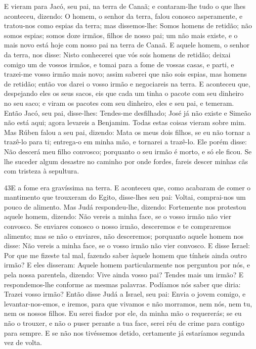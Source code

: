 E vieram para Jacó, seu pai, na terra de Canaã; e contaram-lhe
tudo o que lhes aconteceu, dizendo: O homem, o senhor da
terra, falou conosco asperamente, e tratou-nos como espias da terra;
mas dissemos-lhe: Somos homens de retidão; não somos espias;
somos doze irmãos, filhos de nosso pai; um não mais existe, e
o mais novo está hoje com nosso pai na terra de Canaã. E
aquele homem, o senhor da terra, nos disse: Nisto conhecerei que vós
sois homens de retidão; deixai comigo um de vossos irmãos, e tomai
para a fome de vossas casas, e parti, e trazei-me vosso irmão
mais novo; assim saberei que não sois espias, mas homens de retidão;
então vos darei o vosso irmão e negociareis na terra. E
aconteceu que, despejando eles os seus sacos, eis que cada um tinha
o pacote com seu dinheiro no seu saco; e viram os pacotes com seu
dinheiro, eles e seu pai, e temeram. Então Jacó, seu pai,
disse-lhes: Tendes-me desfilhado; José já não existe e Simeão não
está aqui; agora levareis a Benjamim. Todas estas coisas vieram
sobre mim. Mas Rúben falou a seu pai, dizendo: Mata os meus
dois filhos, se eu não tornar a trazê-lo para ti; entrega-o em minha
mão, e tornarei a trazê-lo. Ele porém disse: Não descerá meu
filho convosco; porquanto o seu irmão é morto, e só ele ficou. Se
lhe suceder algum desastre no caminho por onde fordes, fareis descer
minhas cãs com tristeza à sepultura.

\smallskip

\lettrine{43} E a fome era gravíssima na terra. E
aconteceu que, como acabaram de comer o mantimento que trouxeram do
Egito, disse-lhes seu pai: Voltai, comprai-nos um pouco de alimento.
Mas Judá respondeu-lhe, dizendo: Fortemente nos protestou aquele
homem, dizendo: Não vereis a minha face, se o vosso irmão não vier
convosco. Se enviares conosco o nosso irmão, desceremos e te
compraremos alimento; mas se não o enviares, não desceremos;
porquanto aquele homem nos disse: Não vereis a minha face, se o
vosso irmão não vier convosco. E disse Israel: Por que me
fizeste tal mal, fazendo saber àquele homem que tínheis ainda outro
irmão? E eles disseram: Aquele homem particularmente nos
perguntou por nós, e pela nossa parentela, dizendo: Vive ainda vosso
pai? Tendes mais um irmão? E respondemos-lhe conforme as mesmas
palavras. Podíamos nós saber que diria: Trazei vosso irmão?
Então disse Judá a Israel, seu pai: Envia o jovem comigo, e
levantar-nos-emos, e iremos, para que vivamos e não morramos, nem
nós, nem tu, nem os nossos filhos. Eu serei fiador por ele, da
minha mão o requererás; se eu não o trouxer, e não o puser perante a
tua face, serei réu de crime para contigo para sempre. E se
não nos tivéssemos detido, certamente já estaríamos segunda vez de
volta.

